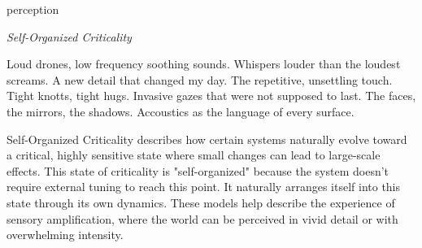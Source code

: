 

\begin{center}
\vspace*{\fill}
\Huge perception

\vspace{2cm}

\begin{flushright}
\large
\textit{Self-Organized Criticality}
\end{flushright}

\vspace*{\fill}
\end{center}

\normalsize

Loud drones, low frequency soothing sounds.
Whispers louder than the loudest screams. 
A new detail that changed my day. 
The repetitive, unsettling  touch.
Tight knotts, tight hugs.
Invasive gazes that were not supposed to last.
The faces, the mirrors, the shadows. 
Accoustics as the language of every surface.

Self-Organized Criticality describes how certain systems naturally evolve toward a critical, highly sensitive state where small changes can lead to large-scale effects. This state of criticality is "self-organized" because the system doesn’t require external tuning to reach this point. It naturally arranges itself into this state through its own dynamics. These models help describe the experience of sensory amplification, where the world can be perceived in vivid detail or with overwhelming intensity. \citep{adami1993}

